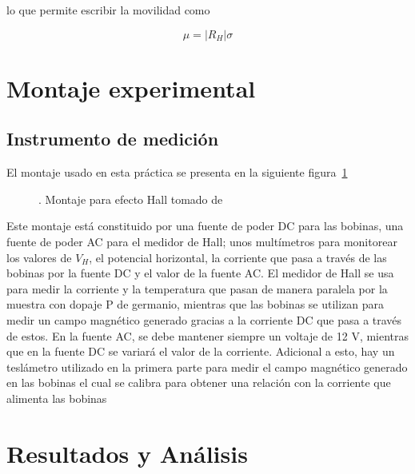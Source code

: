 \documentclass[%
 reprint,
 amsmath,amssymb,
 aps,
]{revtex4-1}
\begin{document}
lo que permite escribir la movilidad como 

\begin{equation}
    \mu=|R_H|\sigma
    \label{movilidad_hall}
\end{equation}

\section{Montaje experimental}
\subsection{Instrumento de medición}

El montaje usado en esta práctica se presenta en la siguiente figura~\ref{montaje Hall}

\begin{figure}[h]
\caption{\label{montaje Hall}. Montaje para efecto Hall tomado de~\cite{guia hall}}
\end{figure}

Este montaje está constituido por una fuente de poder DC para las bobinas, una fuente de poder AC para el medidor de Hall; unos multímetros para monitorear los valores de $V_H$, el potencial horizontal, la corriente que pasa a través de las bobinas por la fuente DC y el valor de la fuente AC. El medidor de Hall se usa para medir la corriente y la temperatura que pasan de manera paralela por la muestra con dopaje P de germanio, mientras que las bobinas se utilizan para medir un campo magnético generado gracias a la corriente DC que pasa a través de estos. En la fuente AC, se debe mantener siempre un voltaje de 12 V, mientras que en la fuente DC se variará el valor de la corriente. Adicional a esto, hay un teslámetro utilizado en la primera parte para medir el campo magnético generado en las bobinas el cual se calibra para obtener una relación con la corriente que alimenta las bobinas

\section{Resultados y Análisis}
\end{document}
